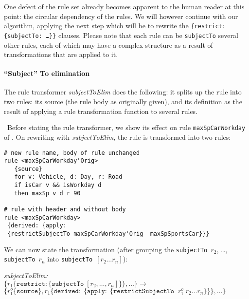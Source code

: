 One defect of the rule set already becomes apparent to the human reader at
this point: the circular dependency of the rules. We will however continue
with our algorithm, applying the next step which will be to rewrite the
\texttt{\{restrict: \{subjectTo: \dots\}\}} clauses.  Please note that each
rule can be \texttt{subjectTo} several other rules, each of which may have a
complex structure as a result of transformations that are applied to it.


\paragraph{\textbf{``Subject'' To elimination}}

The rule transformer \emph{subjectToElim} does the following: it splits up the
rule into two rules: its source (the rule body as originally given), and its
definition as the result of applying a rule transformation function to several rules.

\begin{example}\label{ex:rewrite_subject_to}\
Before stating the rule transformer, we show its effect on rule
\texttt{maxSpCarWorkday} of . On rewriting
with \emph{subjectToElim}, the rule is transformed into two rules:

\begin{lstlisting}
# new rule name, body of rule unchanged
rule <maxSpCarWorkday'Orig>
   {source}
   for v: Vehicle, d: Day, r: Road
   if isCar v && isWorkday d
   then maxSp v d r 90

# rule with header and without body
rule <maxSpCarWorkday>
 {derived: {apply: 
 {restrictSubjectTo maxSpCarWorkday'Orig  maxSpSportsCar}}}
\end{lstlisting}
\end{example}

We can now state the transformation (after grouping the
\texttt{subjectTo $r_2$}, \dots, \texttt{subjectTo $r_n$} into
\texttt{subjectTo $[r_2 \dots r_n]$}):


\noindent
\emph{subjectToElim:}\\
$
\{r_1 \{\mathtt{restrict}: \{\mathtt{subjectTo}\; [r_2, \dots, r_n]\}\}, \dots \} \longrightarrow$\\
$\{r_1^o \{\mathtt{source}\}, r_1 \{\mathtt{derived:}\; \{\mathtt{apply:}\; \{
\mathtt{restrictSubjectTo}\;\; r_1^o\; r_2 \dots r_n \}\}\}, \dots \}
$



